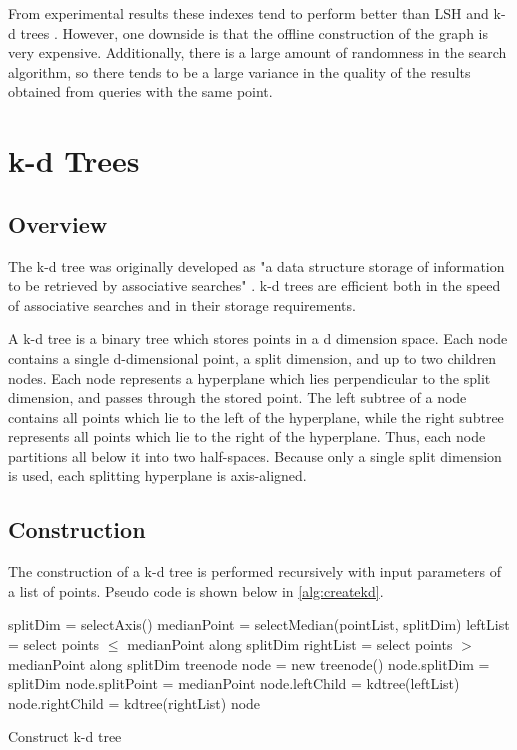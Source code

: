 From experimental results these indexes tend to perform better than LSH and k-d trees \citep{hajebi2011fast}.  However, one downside is that the offline construction of the graph is very expensive.  Additionally, there is a large amount of randomness in the search algorithm, so there tends to be a large variance in the quality of the results obtained from queries with the same point.

\section{k-d Trees}
\label{sec:kdtree}

\subsection{Overview}
The k-d tree was originally developed as "a data structure storage of information to be retrieved by associative searches" \citep{bentley1975multidimensional}. k-d trees are efficient both in the speed of associative searches and in their storage requirements.

A k-d tree is a binary tree which stores points in a d dimension space.  Each node contains a single d-dimensional point, a split dimension, and up to two children nodes.  Each node represents a hyperplane which lies perpendicular to the split dimension, and passes through the stored point.  The left subtree of a node contains all points which lie to the left of the hyperplane, while the right subtree represents all points which lie to the right of the hyperplane.  Thus, each node partitions all below it into two half-spaces.  Because only a single split dimension is used, each splitting hyperplane is axis-aligned.

\subsection{Construction}

The construction of a k-d tree is performed recursively with input parameters of a list of points.  Pseudo code is shown below in \ref{alg:createkd}.  

\begin{algorithm}
\begin{algorithmic}
	\State splitDim = selectAxis()
	\State
	\State medianPoint = selectMedian(pointList, splitDim)
	\State leftList = select points $\leq$ medianPoint along splitDim
	\State rightList = select points $>$ medianPoint along splitDim
	\State
	\State treenode node = new treenode()
	\State node.splitDim = splitDim
	\State node.splitPoint = medianPoint
	\State node.leftChild = kdtree(leftList)
	\State node.rightChild = kdtree(rightList)
	\State
	\State \Return node
\EndFunction
\end{algorithmic}
\caption{Construct k-d tree}
\label{alg:createkd}
\end{algorithm}

